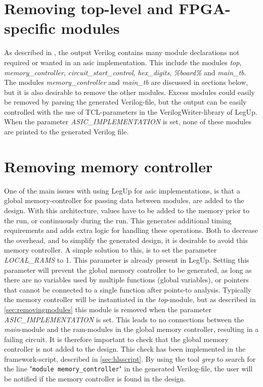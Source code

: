 \section{\label{sec:removingmodules}Removing top-level and FPGA-specific modules}
As described in \cite{holm2015pro}, the output Verilog contains many module declarations not required or wanted in an \gls{asic} implementation. This include the modules \textit{top}, \textit{memory\_controller}, \textit{circuit\_start\_control}, \textit{hex\_digits}, \textit{\%board\%} and \textit{main\_tb}. The modules \textit{memory\_controller} and \textit{main\_tb} are discussed in sections below, but it is also desirable to remove the other modules. Excess modules could easily be removed by parsing the generated Verilog-file, but the output can be easily controlled with the use of TCL-parameters in the VerilogWriter-library of LegUp. When the parameter \textit{ASIC\_IMPLEMENTATION} is set, none of these modules are printed to the generated Verilog file.

\section{Removing memory controller}
One of the main issues with using LegUp for \gls{asic} implementations, is that a global memory-controller for passing data between modules, are added to the design. With this architecture, values have to be added to the memory prior to the run, or continuously during the run. This generates additional timing requirements and adds extra logic for handling these operations. Both to decrease the overhead, and to simplify the generated design, it is desirable to avoid this memory controller. A simple solution to this, is to set the parameter \textit{LOCAL\_RAMS} to 1. This parameter is already present in LegUp. Setting this parameter will prevent the global memory controller to be generated, as long as there are no variables used by multiple functions (global variables), or pointers that cannot be connected to a single function after points-to analysis. Typically the memory controller will be instantiated in the \textit{top}-module, but as described in \cref{sec:removingmodules} this module is removed when the parameter \textit{ASIC\_IMPLEMENTATION} is set. This leads to no connections between the \textit{main}-module and the \gls{ram}-modules in the global memory controller, resulting in a failing circuit. It is therefore important to check that the global memory controller is not added to the design. This check has been implemented in the framework-script, described in \cref{sec:hlsscript}. By using the tool \textit{grep} to search for the line "\verb!module memory_controller!" in the generated Verilog-file, the user will be notified if the memory controller is found in the design.

